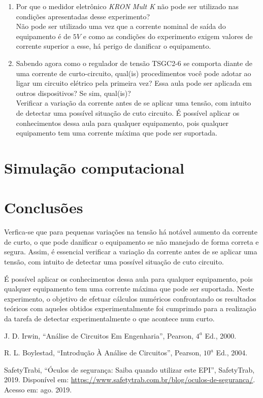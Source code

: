 \documentclass[a4paper,12pt,oneside,openany,table,xcdraw]{article}
\begin{document}
\begin{enumerate}[1)]
\item Por que o medidor eletrônico \emph{KRON Mult K} não pode ser utilizado nas condições apresentadas desse experimento?\\
Não pode ser utilizado uma vez que a corrente nominal de saída do equipamento é de $5V$ e como as condições do experimento exigem valores de corrente superior a esse, há perigo de danificar o equipamento.

\item Sabendo agora como o regulador de tensão TSGC2-6 se comporta diante de uma corrente de curto-circuito, qual(is) procedimentos você pode adotar ao ligar um circuito elétrico pela primeira vez? Essa aula pode ser aplicada em outros dispositivos? Se sim, qual(is)?\\
Verificar a variação da corrente antes de se aplicar uma tensão, com intuito de detectar uma possível situação de cuto circuito.
É possível aplicar os conhecimentos dessa aula para qualquer equipamento, pois qualquer equipamento tem uma corrente máxima que pode ser suportada.

\end{enumerate}
\section{Simulação computacional} %

\section{Conclusões} %
Verfica-se que para pequenas variações na tensão há notável aumento da corrente de curto, o que pode danificar o equipamento se não manejado de forma correta e segura. Assim, é essencial verificar a variação da corrente antes de se aplicar uma tensão, com intuito de detectar uma possível situação de cuto circuito.

É possível aplicar os conhecimentos dessa aula para qualquer equipamento, pois qualquer equipamento tem uma corrente máxima que pode ser suportada. Neste experimento, o objetivo de efetuar cálculos numéricos confrontando os resultados teóricos com aqueles obtidos experimentalmente foi cumprimdo para a realização da tarefa de detectar experimentalmente o que acontece num curto.

\newpage
\begin{thebibliography}{9} 
    J. D. Irwin,
    “Análise de Circuitos Em Engenharia”, Pearson, $4^a$ Ed., 2000.

    R. L. Boylestad,
    “Introdução À Análise de Circuitos”, Pearson, $10^a$ Ed., 2004.

    SafetyTrabi,
    “Óculos de segurança: Saiba quando utilizar este EPI”, SafetyTrab, 2019.
 Disponível em:
 \url{https://www.safetytrab.com.br/blog/oculos-de-seguranca/}. Acesso em: ago. 2019.


\end{thebibliography}
\end{document}
